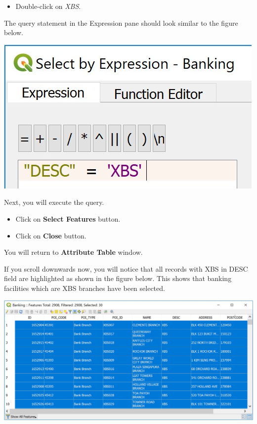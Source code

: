 \documentclass[
  letterpaper,
  DIV=11,
  numbers=noendperiod]{scrreprt}
\providecommand{\tightlist}{%
  \setlength{\itemsep}{0pt}\setlength{\parskip}{0pt}}\usepackage{longtable,booktabs,array}
\begin{document}
\begin{itemize}
\tightlist
\item
  Double-click on \emph{XBS}.
\end{itemize}

The query statement in the Expression pane should look similar to the
figure below.

\includegraphics{./img05/image6.jpg}

Next, you will execute the query.

\begin{itemize}
\tightlist
\item
  Click on \textbf{Select Features} button.
\item
  Click on \textbf{Close} button.
\end{itemize}

You will return to \textbf{Attribute Table} window.

If you scroll downwards now, you will notice that all records with XBS
in DESC field are highlighted as shown in the figure below. This shows
that banking facilities which are XBS branches have been selected.

\includegraphics{./img05/image7.jpg}
\end{document}
